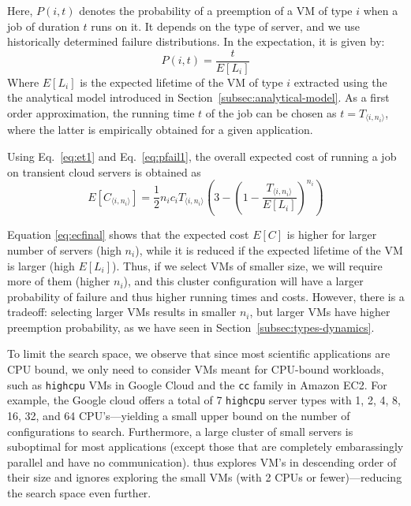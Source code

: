 Here, $P(i, t)$ denotes the probability of a preemption of a VM of type $i$ when a job of duration $t$ runs on it. 
%
It depends on the type of server, and we use historically determined failure distributions.
In the expectation, it is given by:
\begin{equation}
  \label{eq:pi}
  P(i, t) = \dfrac{t}{E[L_i]}
\end{equation}
Where $E[L_i]$ is the expected lifetime of the VM of type $i$ extracted using the the analytical model introduced in Section~\ref{subsec:analytical-model}.
As a first order approximation, the running time $t$ of the job can be chosen as $t=T_{\langle i,n_i \rangle}$, where the latter is empirically obtained for a given application.

Using Eq.~\ref{eq:et1} and Eq.~\ref{eq:pfail1}, the overall expected cost of running a job on transient cloud servers is obtained as
\begin{equation}
  \label{eq:ecfinal}
  E[C_{\langle i,n_i \rangle}] = \frac{1}{2}n_i c_i T_{\langle i,n_i \rangle}\left(3 - \left(1-\dfrac{T_{\langle i,n_i \rangle}}{E[L_i]}\right)^{n_i}\right)
\end{equation}

Equation \ref{eq:ecfinal} shows that the expected cost $E[C]$ is higher for larger number of servers (high $n_i$), while it is reduced if the expected lifetime of the VM is larger (high $E[L_i]$). 
%
Thus, if we select VMs of smaller size, we will require more of them (higher $n_i$), and this cluster configuration will have a larger probability of failure and thus higher running times and costs.
However, there is a tradeoff: selecting larger VMs results in smaller $n_i$, but larger VMs have higher preemption probability, as we have seen in Section~\ref{subsec:types-dynamics}. 




To limit the search space, we observe that since most scientific applications are CPU bound, we only need to consider VMs meant for CPU-bound workloads, such as \texttt{highcpu} VMs in Google Cloud and the \texttt{cc} family in Amazon EC2.
For example, the Google cloud offers a total of 7 \texttt{highcpu} server types with 1, 2, 4, 8, 16, 32, and 64 CPU's---yielding a small upper bound on the number of configurations to search. 
Furthermore, a large cluster of small servers is suboptimal for most applications (except those that are completely embarassingly parallel and have no communication).
\sysname thus explores VM's in descending order of their size and ignores exploring the small VMs (with 2 CPUs or fewer)---reducing the search space even further. 


